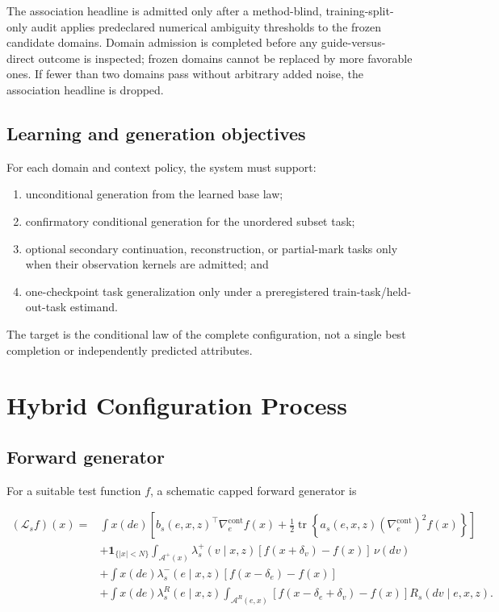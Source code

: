\documentclass[11pt]{article}
\begin{document}
The association headline is admitted only after a method-blind, training-split-only audit applies predeclared numerical ambiguity thresholds to the frozen candidate domains. Domain admission is completed before any guide-versus-direct outcome is inspected; frozen domains cannot be replaced by more favorable ones. If fewer than two domains pass without arbitrary added noise, the association headline is dropped.

\subsection{Learning and generation objectives}
\label{sec:learning-and-generation-objectives}

For each domain and context policy, the system must support:

\begin{enumerate}
\item unconditional generation from the learned base law;
\item confirmatory conditional generation for the unordered subset task;
\item optional secondary continuation, reconstruction, or partial-mark tasks only when their observation kernels are admitted; and
\item one-checkpoint task generalization only under a preregistered train-task/\allowbreak{}held-out-task estimand.
\end{enumerate}

The target is the conditional law of the complete configuration, not a single best completion or independently predicted attributes.

\section{Hybrid Configuration Process}
\label{sec:hybrid-configuration-process}

\subsection{Forward generator}
\label{sec:forward-generator}

For a suitable test function \(f\), a schematic capped forward generator is

\[
\begin{aligned}
(\mathcal L_s f)(x)
={}&\int x(de)\left[
b_s(e,x,z)^\top\nabla_e^{\mathrm{cont}}f(x)
+\tfrac12\operatorname{tr}\!\left\{
a_s(e,x,z)(\nabla_e^{\mathrm{cont}})^2f(x)
\right\}\right]\\
&+\mathbf 1_{\{|x|<N\}}
\int_{\mathcal A^+(x)}\lambda_s^+(v\mid x,z)
[f(x+\delta_v)-f(x)]\,\nu(dv)\\
&+\int x(de)\lambda_s^-(e\mid x,z)
[f(x-\delta_e)-f(x)]\\
&+\int x(de)\lambda_s^R(e\mid x,z)
\int_{\mathcal A^R(e,x)}
[f(x-\delta_e+\delta_v)-f(x)]
R_s(dv\mid e,x,z).
\end{aligned}
\]
\end{document}
